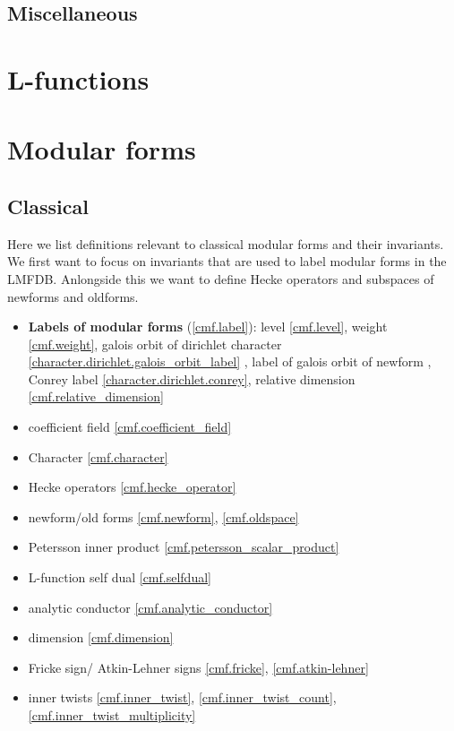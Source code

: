 \section{Miscellaneous}


\chapter{L-functions}


\chapter{Modular forms}

\section{Classical}

Here we list definitions relevant to classical modular forms and their invariants. We first want to
focus on invariants that are used to label modular forms in the LMFDB. Anlongside this we want to
define Hecke operators and subspaces of newforms and oldforms.


\begin{itemize}
    \item \textbf{Labels of modular forms} (\ref{cmf.label}): level \ref{cmf.level}, weight \ref{cmf.weight},
    galois orbit of dirichlet character \ref{character.dirichlet.galois_orbit_label} , label of galois orbit of newform \label{cmf.galois_orbit}, Conrey label \ref{character.dirichlet.conrey}, relative dimension \ref{cmf.relative_dimension}
    \item coefficient field \ref{cmf.coefficient_field}
    \item Character \ref{cmf.character}
    \item Hecke operators \ref{cmf.hecke_operator}
    \item newform/old forms \ref{cmf.newform}, \ref{cmf.oldspace}
    \item Petersson inner product \ref{cmf.petersson_scalar_product}
    \item L-function self dual \ref{cmf.selfdual}
    \item analytic conductor \ref{cmf.analytic_conductor}
    \item dimension \ref{cmf.dimension}
    \item Fricke sign/ Atkin-Lehner signs \ref{cmf.fricke}, \ref{cmf.atkin-lehner}
    \item inner twists \ref{cmf.inner_twist}, \ref{cmf.inner_twist_count}, \ref{cmf.inner_twist_multiplicity}
\end{itemize}

